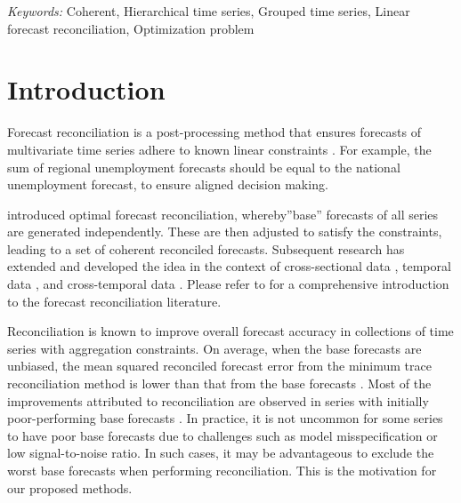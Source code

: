 \documentclass[
  12pt,
  11pt]{article}
\begin{document}
\noindent%
{\it Keywords:} Coherent, Hierarchical time series, Grouped time series,
Linear forecast reconciliation, Optimization problem
\vfill

\newpage
{} %


\hypertarget{sec-introduction}{%
\section{Introduction}\label{sec-introduction}}

Forecast reconciliation is a post-processing method that ensures
forecasts of multivariate time series adhere to known linear constraints
\citep{Hyndman2011-sd, Wickramasuriya2019-fc}. For example, the sum of
regional unemployment forecasts should be equal to the national
unemployment forecast, to ensure aligned decision making.

\citet{Hyndman2011-sd} introduced optimal forecast reconciliation,
whereby''base'' forecasts of all series are generated independently.
These are then adjusted to satisfy the constraints, leading to a set of
coherent reconciled forecasts. Subsequent research has extended and
developed the idea in the context of cross-sectional data
\citep{Hyndman2016-cz, Wickramasuriya2019-fc, Panagiotelis2021-mf},
temporal data \citep{Athanasopoulos2017-jj, Nystrup2020-di}, and
cross-temporal data \citep{Di_Fonzo2023-vo}. Please refer to
\citet{Athanasopoulos2023-sm} for a comprehensive introduction to the
forecast reconciliation literature.

Reconciliation is known to improve overall forecast accuracy in
collections of time series with aggregation constraints. On average,
when the base forecasts are unbiased, the mean squared reconciled
forecast error from the minimum trace reconciliation method
\citep{Wickramasuriya2019-fc} is lower than that from the base forecasts
\citep{Wickramasuriya2021-am}. Most of the improvements attributed to
reconciliation are observed in series with initially poor-performing
base forecasts \citep{Athanasopoulos2017-jj}. In practice, it is not
uncommon for some series to have poor base forecasts due to challenges
such as model misspecification or low signal-to-noise ratio. In such
cases, it may be advantageous to exclude the worst base forecasts when
performing reconciliation. This is the motivation for our proposed
methods.
\end{document}
